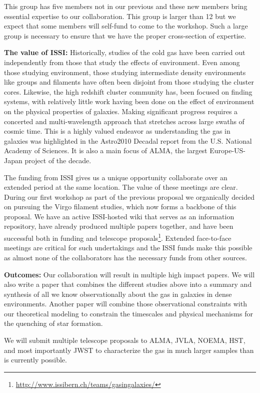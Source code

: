 \documentclass[11pt]{article}
\begin{document}
This group has five members not in our previous and these new members bring essential expertise to our collaboration.  This group is larger than 12 but we expect that some members will self-fund to come to the workshop.  Such a large group is necessary to ensure that we have the proper cross-section of expertise.

\textbf{The value of ISSI:}  
Historically, studies of the cold gas
have been carried out independently from those that study the effects
of environment.  Even among those studying environment, those studying intermediate density environments like groups and filaments have often been disjoint from those studying the cluster cores.  Likewise, the high redshift cluster community has,
been focused on finding systems, with relatively little work having
been done on the effect of environment on the physical properties of
galaxies.  Making significant progress requires a concerted and
multi-wavelength approach that stretches across large swaths of cosmic
time.  This is a highly valued endeavor as understanding the gas in
galaxies was highlighted in the Astro2010 Decadal report from the
U.S. National Academy of Sciences.  It is also a main focus of ALMA,
the largest Europe-US-Japan project of the decade.  

The funding from ISSI gives us a unique opportunity collaborate over an extended period at the same location.  The value of these meetings are clear.  During our first workshop as part of the previous proposal we organically decided on pursuing the Virgo filament studies, which now forms a backbone of this proposal.  We have an active ISSI-hosted wiki that serves as an information repository, have already produced multiple papers together, and have been successful both in funding and telescope proposals\footnote{\url{http://www.issibern.ch/teams/gasingalaxies/}}.  Extended
face-to-face meetings are critical for such undertakings and the ISSI
funds make this possible as almost none of the collaborators has the
necessary funds from other sources.

\textbf{Outcomes:} Our collaboration will result in multiple high
impact papers.  We will also write a
paper that combines the different studies above into a summary and
synthesis of all we know observationally about the gas in galaxies in
dense environments.  Another paper will combine those observational
constraints with our theoretical modeling to constrain the timescales
and physical mechanisms for the quenching of star formation.

We will submit multiple telescope proposals to ALMA, JVLA, NOEMA, HST, and most importantly JWST 
 to characterize the gas in much larger samples than is currently possible.
\end{document}
